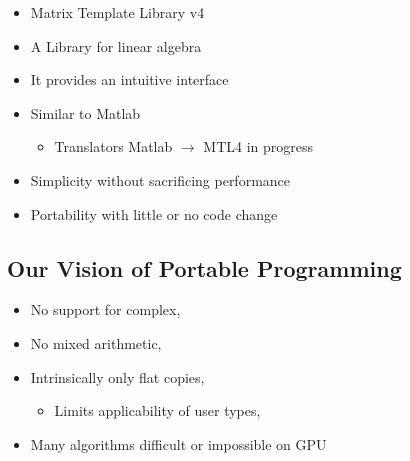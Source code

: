 \begin{frame}
  \begin{itemize}
  \item Matrix Template Library v4
  \item A Library for linear algebra
  \item It provides an intuitive interface
  \item Similar to Matlab
    \begin{itemize}
    \item Translators Matlab $\rightarrow$ MTL4 in progress
    \end{itemize}
  \item Simplicity without sacrificing performance
  \item Portability with little or no code change

  \end{itemize}

\end{frame}


\subsection{Our Vision of Portable Programming}

\addtocounter{framenumber}{1}




\begin{frame}
  \begin{itemize}
  \item No support for complex,
  \item No mixed arithmetic,
  \item Intrinsically only flat copies,
    \begin{itemize}
    \item Limits applicability of user types,
    \end{itemize}
  \item Many algorithms difficult or impossible on GPU

  \end{itemize}

\end{frame}



